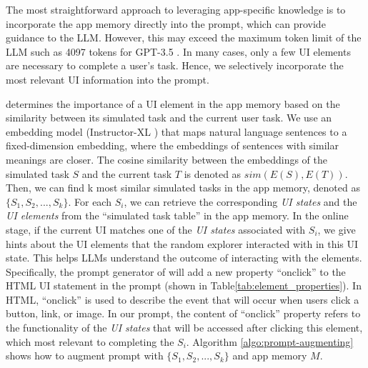 The most straightforward approach to leveraging app-specific knowledge is to incorporate the app memory directly into the prompt, which can provide guidance to the LLM.
However, this may exceed the maximum token limit of the LLM such as 4097 tokens for GPT-3.5 \cite{chatgpt}. %
In many cases, only a few UI elements are necessary to complete a user's task.
Hence, we selectively incorporate the most relevant UI information into the prompt.

\name determines the importance of a UI element in the app memory based on the similarity between its simulated task and the current user task.
We use an embedding model (Instructor-XL \cite{instructor-xl}) that maps natural language sentences to a fixed-dimension embedding, where the embeddings of sentences with similar meanings are closer. The cosine similarity between the embeddings of the simulated task $S$ and the current task $T$ is denoted as $sim(E(S), E(T))$.
Then, we can find k most similar simulated tasks in the app memory, denoted as $\{S_1, S_2,..., S_k\}$.
For each $S_i$, we can retrieve the corresponding \textit{UI states} and the \textit{UI elements} from the ``simulated task table'' in the app memory. 
In the online stage, if the current UI matches one of the \textit{UI states} associated with $S_i$, we give hints about the UI elements that the random explorer interacted with in this UI state. This helps LLMs understand the outcome of interacting with the elements. 
Specifically, the prompt generator of \name will add a new property ``onclick'' to the HTML UI statement in the prompt (shown in Table\ref{tab:element_properties}). In HTML, ``onclick'' is used to describe the event that will occur when users click a button, link, or image. 
In our prompt, the content of  ``onclick'' property refers to the functionality of the \textit{UI states} that will be accessed after clicking this element, which  most relevant to completing the $S_i$. Algorithm \ref{algo:prompt-augmenting} shows how to augment prompt with $\{S_1, S_2,...,  S_k\}$ and app memory $M$.


